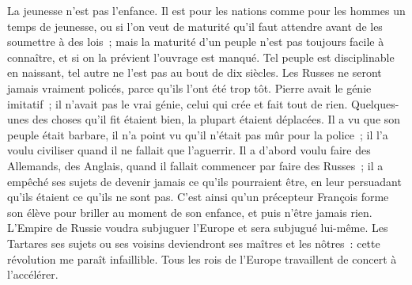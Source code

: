 \documentclass[french,twoside]{book} %
\begin{document}
La jeunesse n’est pas l’enfance. Il est pour les nations comme pour les hommes un temps de jeunesse, ou si l’on veut de maturité qu’il faut attendre avant de les soumettre à des lois ; mais la maturité d’un peuple n’est pas toujours facile à connaître, et si on la prévient l’ouvrage est manqué. Tel peuple est disciplinable en naissant, tel autre ne l’est pas au bout de dix siècles. Les Russes ne seront jamais vraiment policés, parce qu’ils l’ont été trop tôt. Pierre avait le génie imitatif ; il n’avait pas le vrai génie, celui qui crée et fait tout de rien. Quelques-unes des choses qu’il fit étaient bien, la plupart étaient déplacées. Il a vu que son peuple était barbare, il n’a point vu qu’il n’était pas mûr pour la police ; il l’a voulu civiliser quand il ne fallait que l’aguerrir. Il a d’abord voulu faire des Allemands, des Anglais, quand il fallait commencer par faire des Russes ; il a empêché ses sujets de devenir jamais ce qu’ils pourraient être, en leur persuadant qu’ils étaient ce qu’ils ne sont pas. C’est ainsi qu’un précepteur François forme son élève pour briller au moment de son enfance, et puis n’être jamais rien. L’Empire de Russie voudra subjuguer l’Europe et sera subjugué lui-même. Les Tartares ses sujets ou ses voisins deviendront ses maîtres et les nôtres : cette révolution me paraît infaillible. Tous les rois de l’Europe travaillent de concert à l’accélérer.
\end{document}
